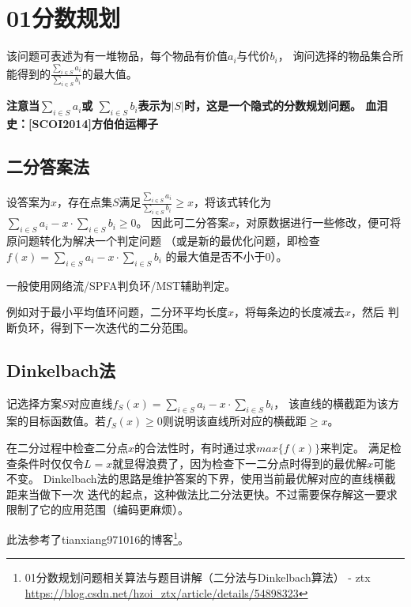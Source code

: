 \section{01分数规划}
该问题可表述为有一堆物品，每个物品有价值$a_i$与代价$b_i$，
询问选择的物品集合所能得到的$\frac{\displaystyle \sum_{i\in S}{a_i}}
	{\displaystyle \sum_{i\in S}{b_i}}$的最大值。

{\bfseries 注意当$\displaystyle \sum_{i\in S}{a_i}$或
$\displaystyle \sum_{i\in S}{b_i}$表示为$|S|$时，这是一个隐式的分数规划问题。
血泪史：[SCOI2014]方伯伯运椰子}

\subsection{二分答案法}

设答案为$x$，存在点集$S$满足$\frac{\displaystyle \sum_{i\in S}{a_i}}
	{\displaystyle \sum_{i\in S}{b_i}}\geq x$，将该式转化为
$\displaystyle \sum_{i\in S}{a_i}-x\cdot \sum_{i\in S}{b_i}\geq 0$。
因此可二分答案$x$，对原数据进行一些修改，便可将原问题转化为解决一个判定问题
（或是新的最优化问题，即检查
$\displaystyle f(x)=\sum_{i\in S}{a_i}-x\cdot \sum_{i\in S}{b_i}$
的最大值是否不小于0）。

一般使用网络流/SPFA判负环/MST辅助判定。

例如对于最小平均值环问题，二分环平均长度$x$，将每条边的长度减去$x$，然后
判断负环，得到下一次迭代的二分范围。

\subsection{Dinkelbach法}
记选择方案$S$对应直线$f_S(x)=\sum_{i\in S}{a_i}-x\cdot \sum_{i\in S}{b_i}$，
该直线的横截距为该方案的目标函数值。若$f_S(x)\geq 0$则说明该直线所对应的横截距$\geq x$。

在二分过程中检查二分点$x$的合法性时，有时通过求$max\{f(x)\}$来判定。
满足检查条件时仅仅令$L=x$就显得浪费了，因为检查下一二分点时得到的最优解$x$可能不变。
Dinkelbach法的思路是维护答案的下界，使用当前最优解对应的直线横截距来当做下一次
迭代的起点，这种做法比二分法更快。不过需要保存解这一要求限制了它的应用范围（编码更麻烦）。

此法参考了tianxiang971016的博客\footnote{
	01分数规划问题相关算法与题目讲解（二分法与Dinkelbach算法） - ztx
	\url{https://blog.csdn.net/hzoi\_ztx/article/details/54898323}
}。
